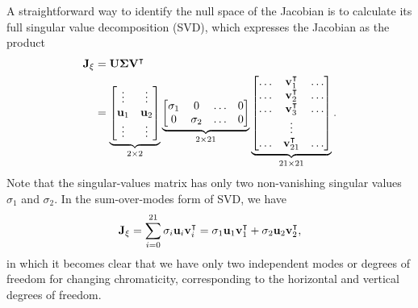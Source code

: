 A straightforward way to identify the null space of the Jacobian is to calculate its full singular value decomposition (SVD), which expresses the Jacobian as the product
\begin{equation}
    \begin{aligned}
        \vb{J}_\xi &= \vb{U}\boldsymbol{\Sigma}\vb{V}^\intercal\\
                   &= \underbrace{\mqty[\vdots & \vdots \\
                            \vb{u}_1 & \vb{u}_2\\
                            \vdots & \vdots]}_{2\times 2}
                            \underbrace{\mqty[\sigma_1 & 0 & \dots & 0\\
                                             0 & \sigma_2 & \dots & 0 ]}_{2\times21}
                            \underbrace{\mqty[
                                \dots & \vb{v}^\intercal_1 & \dots\\
                                \dots & \vb{v}^\intercal_2 & \dots\\
                                \dots & \vb{v}^\intercal_3 & \dots\\
                                      & \vdots &    \\
                                \dots & \vb{v}^\intercal_{21} & \dots\\                              ]}_{21\times21}.
    \end{aligned}
\end{equation}
Note that the singular-values matrix has only two non-vanishing singular values $\sigma_1$ and $\sigma_2$. In the sum-over-modes form of SVD, we have
\begin{equation}
    \vb{J}_\xi = \sum_{i=0}^{21}\sigma_i\vb{u}_i\vb{v}_{i}^{\intercal} = \sigma_1 \vb{u}_1\vb{v}_{1}^\intercal + \sigma_2 \vb{u}_2\vb{v}_{2}^\intercal,
\end{equation}
in which it becomes clear that we have only two independent modes or degrees of freedom for changing chromaticity, corresponding to the horizontal and vertical degrees of freedom.

